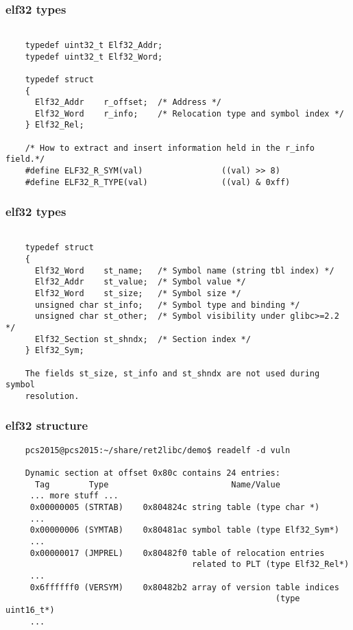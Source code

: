 \documentclass{beamer}
\begin{document}
\begin{frame}[fragile]
\frametitle{elf32 types}

	\footnotesize 
	\begin{verbatim}
	
	typedef uint32_t Elf32_Addr;
	typedef uint32_t Elf32_Word;
	
	typedef struct
	{
	  Elf32_Addr    r_offset;  /* Address */
	  Elf32_Word    r_info;    /* Relocation type and symbol index */
	} Elf32_Rel;
	
	/* How to extract and insert information held in the r_info field.*/
	#define ELF32_R_SYM(val)                ((val) >> 8)
	#define ELF32_R_TYPE(val)               ((val) & 0xff)
	\end{verbatim}
	\normalsize

\end{frame}

\begin{frame}[fragile]
\frametitle{elf32 types}

	\footnotesize 
	\begin{verbatim}
	
	typedef struct
	{
	  Elf32_Word    st_name;   /* Symbol name (string tbl index) */
	  Elf32_Addr    st_value;  /* Symbol value */
	  Elf32_Word    st_size;   /* Symbol size */
	  unsigned char st_info;   /* Symbol type and binding */
	  unsigned char st_other;  /* Symbol visibility under glibc>=2.2 */
	  Elf32_Section st_shndx;  /* Section index */
	} Elf32_Sym;
	
	The fields st_size, st_info and st_shndx are not used during symbol
	resolution.
	\end{verbatim}
	\normalsize

\end{frame}

\begin{frame}[fragile]
\frametitle{elf32 structure}

	\scriptsize   
	\begin{verbatim}
	pcs2015@pcs2015:~/share/ret2libc/demo$ readelf -d vuln
	
	Dynamic section at offset 0x80c contains 24 entries:
	  Tag        Type                         Name/Value
	 ... more stuff ...
	 0x00000005 (STRTAB)    0x804824c string table (type char *)
	 ...
	 0x00000006 (SYMTAB)    0x80481ac symbol table (type Elf32_Sym*)
	 ...
	 0x00000017 (JMPREL)    0x80482f0 table of relocation entries 
	                                  related to PLT (type Elf32_Rel*)
	 ...
	 0x6ffffff0 (VERSYM)    0x80482b2 array of version table indices  
	                                                   (type uint16_t*)
	 ... 
	\end{verbatim}
	\normalsize

\end{frame}
\end{document}
